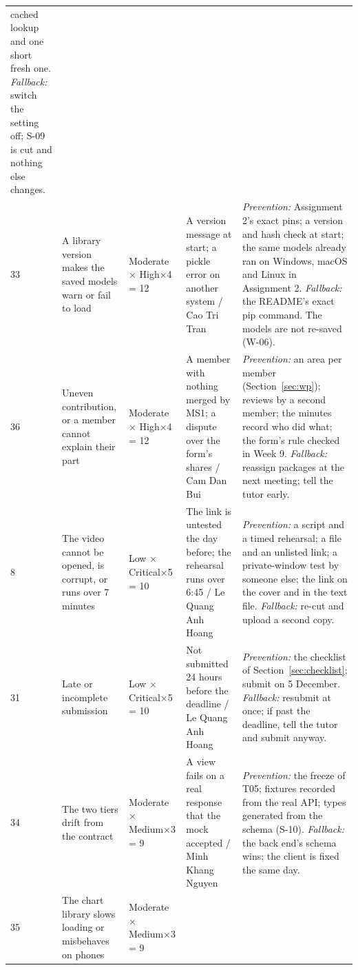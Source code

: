 {\begin{longtable}{@{}L{0.7cm}L{3.2cm}L{2.0cm}L{3.4cm}L{4.6cm}@{}}
cached lookup and one short fresh one. \textit{Fallback:} switch the setting off; S-09 is cut and
nothing else changes. \\
33 & A library version makes the saved models warn or fail to load & Moderate × High×4 = 12 &
A version message at start; a pickle error on another system / Cao Tri Tran &
\textit{Prevention:} Assignment 2's exact pins; a version and hash check at start; the same models
already ran on Windows, macOS and Linux in Assignment 2. \textit{Fallback:} the README's exact pip
command. The models are not re-saved (W-06). \\
36 & Uneven contribution, or a member cannot explain their part & Moderate × High×4 = 12 &
A member with nothing merged by MS1; a dispute over the form's shares / Cam Dan Bui &
\textit{Prevention:} an area per member (Section~\ref{sec:wp}); reviews by a second member; the
minutes record who did what; the form's rule checked in Week 9. \textit{Fallback:} reassign packages
at the next meeting; tell the tutor early. \\
8 & The video cannot be opened, is corrupt, or runs over 7 minutes & Low × Critical×5 = 10 &
The link is untested the day before; the rehearsal runs over 6:45 / Le Quang Anh Hoang &
\textit{Prevention:} a script and a timed rehearsal; a file and an unlisted link; a private-window
test by someone else; the link on the cover and in the text file. \textit{Fallback:} re-cut and
upload a second copy. \\
31 & Late or incomplete submission & Low × Critical×5 = 10 &
Not submitted 24 hours before the deadline / Le Quang Anh Hoang &
\textit{Prevention:} the checklist of Section~\ref{sec:checklist}; submit on 5 December.
\textit{Fallback:} resubmit at once; if past the deadline, tell the tutor and submit anyway. \\
34 & The two tiers drift from the contract & Moderate × Medium×3 = 9 &
A view fails on a real response that the mock accepted / Minh Khang Nguyen &
\textit{Prevention:} the freeze of T05; fixtures recorded from the real API; types generated from
the schema (S-10). \textit{Fallback:} the back end's schema wins; the client is fixed the same
day. \\
35 & The chart library slows loading or misbehaves on phones & Moderate × Medium×3 = 9 &

\end{longtable}}
